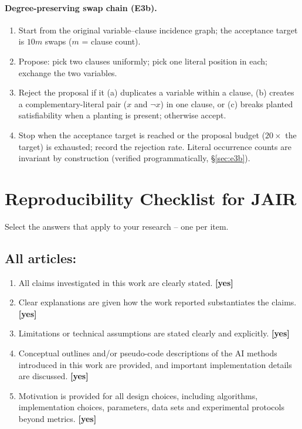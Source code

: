 \documentclass[manuscript, screen, review]{jair}
\begin{document}
\paragraph{Degree-preserving swap chain (E3b).}
\begin{enumerate}
    \item Start from the original variable--clause incidence graph; the
    acceptance target is $10m$ swaps ($m$ = clause count).
    \item Propose: pick two clauses uniformly; pick one literal position in
    each; exchange the two variables.
    \item Reject the proposal if it (a) duplicates a variable within a
    clause, (b) creates a complementary-literal pair ($x$ and $\neg x$) in
    one clause, or (c) breaks planted satisfiability when a planting is
    present; otherwise accept.
    \item Stop when the acceptance target is reached or the proposal budget
    ($20\times$ the target) is exhausted; record the rejection rate.
    Literal occurrence counts are invariant by construction (verified
    programmatically, \S\ref{sec:e3b}).
\end{enumerate}

\section{Reproducibility Checklist for JAIR}
\label{app:checklist}

Select the answers that apply to your research -- one per item.

\subsection*{All articles:}

\begin{enumerate}
    \item All claims investigated in this work are clearly stated.
    \textbf{[yes]}
    \item Clear explanations are given how the work reported substantiates the claims.
    \textbf{[yes]}
    \item Limitations or technical assumptions are stated clearly and explicitly.
    \textbf{[yes]}
    \item Conceptual outlines and/or pseudo-code descriptions of the AI methods introduced in this work are provided, and important implementation details are discussed.
    \textbf{[yes]}
    \item Motivation is provided for all design choices, including algorithms, implementation choices, parameters, data sets and experimental protocols beyond metrics.
    \textbf{[yes]}
\end{enumerate}
\end{document}
